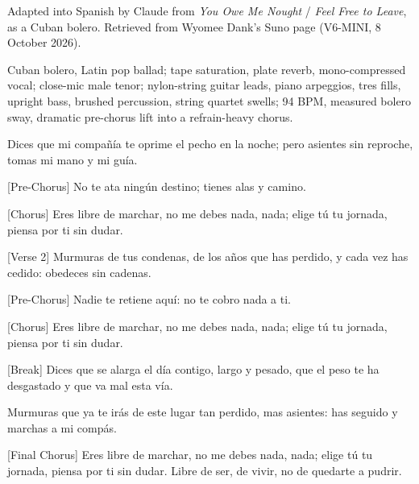 \begin{notes}
Adapted into Spanish by Claude from \emph{You Owe Me Nought} / \emph{Feel Free to Leave}, as a Cuban bolero. Retrieved from Wyomee Dank's Suno page (V6-MINI, 8 October 2026).
\end{notes}
\begin{style}
Cuban bolero, Latin pop ballad; tape saturation, plate reverb, mono-compressed vocal; close-mic male tenor; nylon-string guitar leads, piano arpeggios, tres fills, upright bass, brushed percussion, string quartet swells; 94 BPM, measured bolero sway, dramatic pre-chorus lift into a refrain-heavy chorus.
\end{style}
\begin{lyrics}
[Verse 1]
Dices que mi compañía
te oprime el pecho en la noche;
pero asientes sin reproche,
tomas mi mano y mi guía.

[Pre-Chorus]
No te ata ningún destino;
tienes alas y camino.

[Chorus]
Eres libre de marchar,
no me debes nada, nada;
elige tú tu jornada,
piensa por ti sin dudar.

[Verse 2]
Murmuras de tus condenas,
de los años que has perdido,
y cada vez has cedido:
obedeces sin cadenas.

[Pre-Chorus]
Nadie te retiene aquí:
no te cobro nada a ti.

[Chorus]
Eres libre de marchar,
no me debes nada, nada;
elige tú tu jornada,
piensa por ti sin dudar.

[Break]
Dices que se alarga el día
contigo, largo y pesado,
que el peso te ha desgastado
y que va mal esta vía.

Murmuras que ya te irás
de este lugar tan perdido,
mas asientes: has seguido
y marchas a mi compás.

[Final Chorus]
Eres libre de marchar,
no me debes nada, nada;
elige tú tu jornada,
piensa por ti sin dudar.
Libre de ser, de vivir,
no de quedarte a pudrir.
\end{lyrics}

